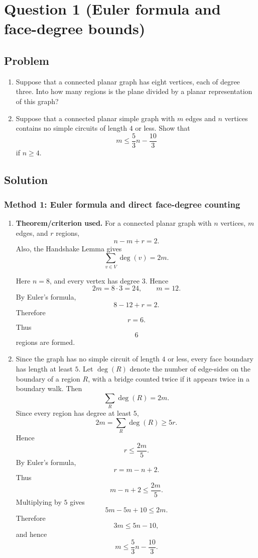 \documentclass[12pt]{article}
\begin{document}
\newpage
\tableofcontents
\newpage

\section{Question 1 (Euler formula and face-degree bounds)}

\subsection{Problem}
\begin{enumerate}[label=(\alph*)]
  \item Suppose that a connected planar graph has eight vertices, each of degree three. Into how many regions is the plane divided by a planar representation of this graph?
  \item Suppose that a connected planar simple graph with $m$ edges and $n$ vertices contains no simple circuits of length $4$ or less. Show that
  \[
    m\le \frac{5}{3}n-\frac{10}{3}
  \]
  if $n\ge 4$.
\end{enumerate}

\subsection{Solution}

\subsubsection{Method 1: Euler formula and direct face-degree counting}
\begin{enumerate}[label=(\alph*)]
  \item \textbf{Theorem/criterion used.} For a connected planar graph with $n$ vertices, $m$ edges, and $r$ regions,
  \[
    n-m+r=2.
  \]
  Also, the Handshake Lemma gives
  \[
    \sum_{v\in V}\deg(v)=2m.
  \]

  Here $n=8$, and every vertex has degree $3$. Hence
  \[
    2m=8\cdot 3=24,
    \qquad
    m=12.
  \]
  By Euler's formula,
  \[
    8-12+r=2.
  \]
  Therefore
  \[
    r=6.
  \]
  Thus
  \[
    \boxed{6}
  \]
  regions are formed.

  \item Since the graph has no simple circuit of length $4$ or less, every face boundary has length at least $5$. Let $\deg(R)$ denote the number of edge-sides on the boundary of a region $R$, with a bridge counted twice if it appears twice in a boundary walk. Then
  \[
    \sum_R \deg(R)=2m.
  \]
  Since every region has degree at least $5$,
  \[
    2m=\sum_R \deg(R)\ge 5r.
  \]
  Hence
  \[
    r\le \frac{2m}{5}.
  \]
  By Euler's formula,
  \[
    r=m-n+2.
  \]
  Thus
  \[
    m-n+2\le \frac{2m}{5}.
  \]
  Multiplying by $5$ gives
  \[
    5m-5n+10\le 2m.
  \]
  Therefore
  \[
    3m\le 5n-10,
  \]
  and hence
  \[
    \boxed{m\le \frac{5}{3}n-\frac{10}{3}.}
  \]
\end{enumerate}
\end{document}
